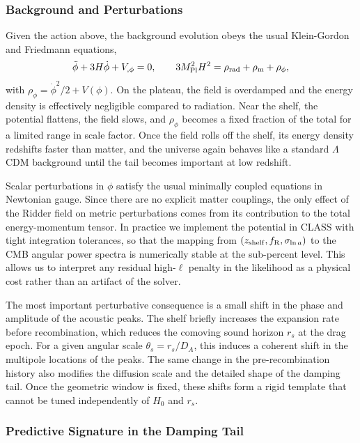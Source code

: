 \documentclass[a4paper,11pt]{article}
\begin{document}
\subsubsection{Background and Perturbations}

Given the action above, the background evolution obeys the usual Klein-Gordon and Friedmann equations,
\begin{equation}
\ddot{\phi} + 3 H \dot{\phi} + V_{,\phi} = 0, \qquad
3 M_{\rm Pl}^2 H^2 = \rho_{\rm rad} + \rho_{\rm m} + \rho_{\phi},
\end{equation}
with $\rho_{\phi} = \dot{\phi}^2/2 + V(\phi)$. On the plateau, the field is overdamped and the energy density is effectively negligible compared to radiation. Near the shelf, the potential flattens, the field slows, and $\rho_{\phi}$ becomes a fixed fraction of the total for a limited range in scale factor. Once the field rolls off the shelf, its energy density redshifts faster than matter, and the universe again behaves like a standard $\Lambda$CDM background until the tail becomes important at low redshift.

Scalar perturbations in $\phi$ satisfy the usual minimally coupled equations in Newtonian gauge. Since there are no explicit matter couplings, the only effect of the Ridder field on metric perturbations comes from its contribution to the total energy-momentum tensor. In practice we implement the potential in CLASS with tight integration tolerances, so that the mapping from $(z_{\rm shelf}, f_{\rm R}, \sigma_{\ln a})$ to the CMB angular power spectra is numerically stable at the sub-percent level. This allows us to interpret any residual high-$\ell$ penalty in the likelihood as a physical cost rather than an artifact of the solver.

The most important perturbative consequence is a small shift in the phase and amplitude of the acoustic peaks. The shelf briefly increases the expansion rate before recombination, which reduces the comoving sound horizon $r_{s}$ at the drag epoch. For a given angular scale $\theta_{s} = r_{s}/D_{A}$, this induces a coherent shift in the multipole locations of the peaks. The same change in the pre-recombination history also modifies the diffusion scale and the detailed shape of the damping tail. Once the geometric window is fixed, these shifts form a rigid template that cannot be tuned independently of $H_{0}$ and $r_{s}$.

\subsubsection{Predictive Signature in the Damping Tail}
\end{document}
